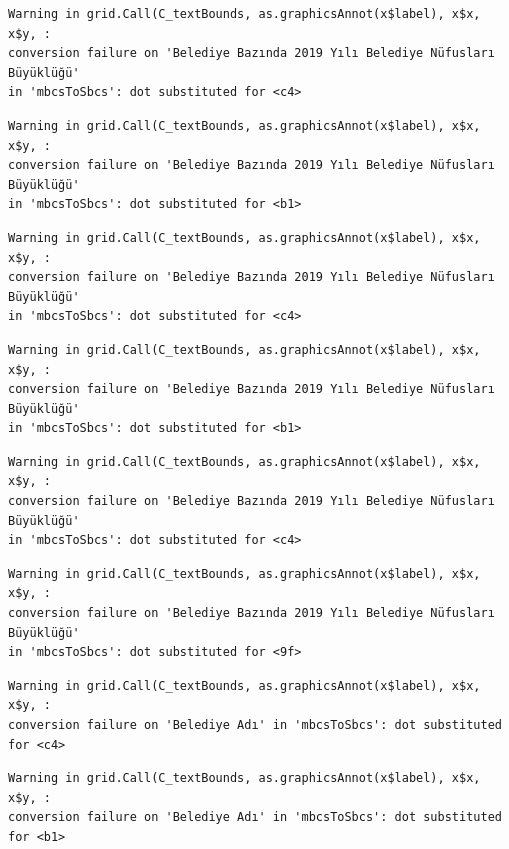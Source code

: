 \documentclass[
  11pt,
  a4paper,
  DIV=11,
  numbers=noendperiod]{scrartcl}
\begin{document}
\begin{verbatim}
Warning in grid.Call(C_textBounds, as.graphicsAnnot(x$label), x$x, x$y, :
conversion failure on 'Belediye Bazında 2019 Yılı Belediye Nüfusları Büyüklüğü'
in 'mbcsToSbcs': dot substituted for <c4>
\end{verbatim}

\begin{verbatim}
Warning in grid.Call(C_textBounds, as.graphicsAnnot(x$label), x$x, x$y, :
conversion failure on 'Belediye Bazında 2019 Yılı Belediye Nüfusları Büyüklüğü'
in 'mbcsToSbcs': dot substituted for <b1>
\end{verbatim}

\begin{verbatim}
Warning in grid.Call(C_textBounds, as.graphicsAnnot(x$label), x$x, x$y, :
conversion failure on 'Belediye Bazında 2019 Yılı Belediye Nüfusları Büyüklüğü'
in 'mbcsToSbcs': dot substituted for <c4>
\end{verbatim}

\begin{verbatim}
Warning in grid.Call(C_textBounds, as.graphicsAnnot(x$label), x$x, x$y, :
conversion failure on 'Belediye Bazında 2019 Yılı Belediye Nüfusları Büyüklüğü'
in 'mbcsToSbcs': dot substituted for <b1>
\end{verbatim}

\begin{verbatim}
Warning in grid.Call(C_textBounds, as.graphicsAnnot(x$label), x$x, x$y, :
conversion failure on 'Belediye Bazında 2019 Yılı Belediye Nüfusları Büyüklüğü'
in 'mbcsToSbcs': dot substituted for <c4>
\end{verbatim}

\begin{verbatim}
Warning in grid.Call(C_textBounds, as.graphicsAnnot(x$label), x$x, x$y, :
conversion failure on 'Belediye Bazında 2019 Yılı Belediye Nüfusları Büyüklüğü'
in 'mbcsToSbcs': dot substituted for <9f>
\end{verbatim}

\begin{verbatim}
Warning in grid.Call(C_textBounds, as.graphicsAnnot(x$label), x$x, x$y, :
conversion failure on 'Belediye Adı' in 'mbcsToSbcs': dot substituted for <c4>
\end{verbatim}

\begin{verbatim}
Warning in grid.Call(C_textBounds, as.graphicsAnnot(x$label), x$x, x$y, :
conversion failure on 'Belediye Adı' in 'mbcsToSbcs': dot substituted for <b1>
\end{verbatim}
\end{document}
